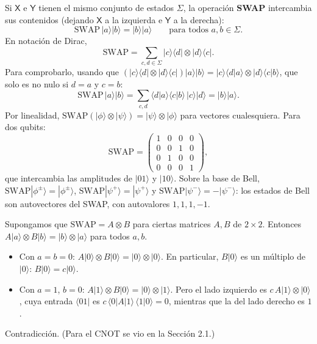 \documentclass[11pt, a4paper, twoside, openright]{report}
\begin{document}
\noindent Si $\mathsf{X}$ e $\mathsf{Y}$ tienen el mismo conjunto de estados $\Sigma$, la operación \textbf{SWAP} intercambia sus contenidos (dejando $\mathsf{X}$ a la izquierda e $\mathsf{Y}$ a la derecha):
\[ \mathrm{SWAP}\,|a\rangle|b\rangle = |b\rangle|a\rangle \qquad \text{para todos } a,b\in\Sigma. \]
En notación de Dirac,
\[ \mathrm{SWAP} = \sum_{c,d\in\Sigma}|c\rangle\langle d|\otimes|d\rangle\langle c|. \]
Para comprobarlo, usando que $(|c\rangle\langle d|\otimes|d\rangle\langle c|)|a\rangle|b\rangle = |c\rangle\langle d|a\rangle\otimes|d\rangle\langle c|b\rangle$, que solo es no nulo si $d = a$ y $c = b$:
\[ \mathrm{SWAP}\,|a\rangle|b\rangle = \sum_{c,d}\langle d|a\rangle\langle c|b\rangle\,|c\rangle|d\rangle = |b\rangle|a\rangle. \]
Por linealidad, $\mathrm{SWAP}(|\phi\rangle\otimes|\psi\rangle) = |\psi\rangle\otimes|\phi\rangle$ para vectores cualesquiera. Para dos qubits:
\[ \mathrm{SWAP} = \begin{pmatrix} 1&0&0&0\\0&0&1&0\\0&1&0&0\\0&0&0&1\end{pmatrix}, \]
que intercambia las amplitudes de $|01\rangle$ y $|10\rangle$. Sobre la base de Bell, $\mathrm{SWAP}|\phi^\pm\rangle = |\phi^\pm\rangle$, $\mathrm{SWAP}|\psi^+\rangle = |\psi^+\rangle$ y $\mathrm{SWAP}|\psi^-\rangle = -|\psi^-\rangle$: los estados de Bell son autovectores del SWAP, con autovalores $1,1,1,-1$.

\begin{tcolorbox}[colback=gray!5!white,colframe=gray!75!black,title=\textbf{El SWAP no es un producto tensorial}]
Supongamos que $\mathrm{SWAP} = A\otimes B$ para ciertas matrices $A, B$ de $2\times2$. Entonces $A|a\rangle\otimes B|b\rangle = |b\rangle\otimes|a\rangle$ para todos $a, b$.
\begin{itemize}
    \item Con $a = b = 0$: $A|0\rangle\otimes B|0\rangle = |0\rangle\otimes|0\rangle$. En particular, $B|0\rangle$ es un múltiplo de $|0\rangle$: $B|0\rangle = c|0\rangle$.
    \item Con $a = 1$, $b = 0$: $A|1\rangle\otimes B|0\rangle = |0\rangle\otimes|1\rangle$. Pero el lado izquierdo es $c\,A|1\rangle\otimes|0\rangle$, cuya entrada $\langle01|$ es $c\,\langle0|A|1\rangle\,\langle1|0\rangle = 0$, mientras que la del lado derecho es $1$.
\end{itemize}
Contradicción. (Para el CNOT se vio en la Sección 2.1.)
\end{tcolorbox}
\end{document}
